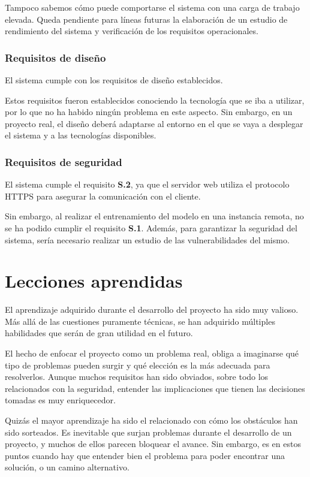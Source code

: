 Tampoco sabemos cómo puede comportarse el sistema con una carga de trabajo elevada.
Queda pendiente para líneas futuras la elaboración de un estudio de rendimiento del sistema y verificación de los requisitos operacionales.

\subsubsection{Requisitos de diseño}
El sistema cumple con los requisitos de diseño establecidos.

Estos requisitos fueron establecidos conociendo la tecnología que se iba a utilizar, por lo que no ha habido ningún problema en este aspecto.
Sin embargo, en un proyecto real, el diseño deberá adaptarse al entorno en el que se vaya a desplegar el sistema y a las tecnologías disponibles.

\subsubsection{Requisitos de seguridad}
El sistema cumple el requisito \textbf{S.2}, ya que el servidor web utiliza el protocolo HTTPS para asegurar la comunicación con el cliente.

Sin embargo, al realizar el entrenamiento del modelo en una instancia remota, no se ha podido cumplir el requisito \textbf{S.1}.
Además, para garantizar la seguridad del sistema, sería necesario realizar un estudio de las vulnerabilidades del mismo.



\section{Lecciones aprendidas}
El aprendizaje adquirido durante el desarrollo del proyecto ha sido muy valioso.
Más allá de las cuestiones puramente técnicas, se han adquirido múltiples habilidades que serán de gran utilidad en el futuro.

El hecho de enfocar el proyecto como un problema real, obliga a imaginarse qué tipo de problemas pueden surgir y qué elección es la más adecuada para resolverlos.
Aunque muchos requisitos han sido obviados, sobre todo los relacionados con la seguridad, entender las implicaciones que tienen las decisiones tomadas es muy enriquecedor.

Quizás el mayor aprendizaje ha sido el relacionado con cómo los obstáculos han sido sorteados.
Es inevitable que surjan problemas durante el desarrollo de un proyecto, y muchos de ellos parecen bloquear el avance.
Sin embargo, es en estos puntos cuando hay que entender bien el problema para poder encontrar una solución, o un camino alternativo.

